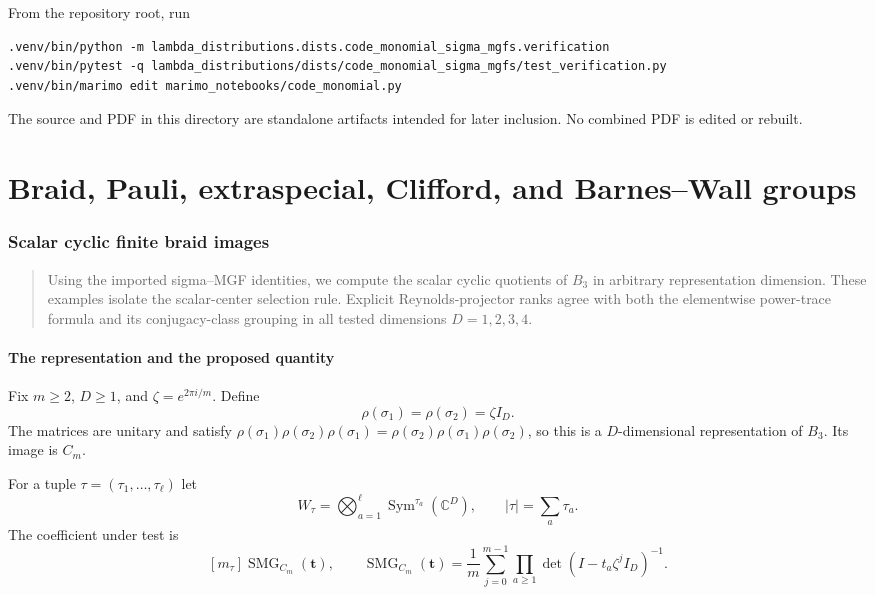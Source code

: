 \documentclass[10pt]{article}
\newcommand{\SMG}{\operatorname{SMG}}
\begin{document}
From the repository root, run
\begin{verbatim}
.venv/bin/python -m lambda_distributions.dists.code_monomial_sigma_mgfs.verification
.venv/bin/pytest -q lambda_distributions/dists/code_monomial_sigma_mgfs/test_verification.py
.venv/bin/marimo edit marimo_notebooks/code_monomial.py
\end{verbatim}
The source and PDF in this directory are standalone artifacts intended for
later inclusion.  No combined PDF is edited or rebuilt.

\clearpage
\part{Braid, Pauli, extraspecial, Clifford, and Barnes--Wall groups}
\section{Scalar cyclic finite braid images}\label{proof:braid-cyclic}
\begingroup
{}
\providecommand{\Sgm}{\SMG}
\renewcommand{\Sgm}{\SMG}
\setcounter{theorem}{0}
\setcounter{proposition}{0}
\setcounter{lemma}{0}
\setcounter{corollary}{0}
\setcounter{remark}{0}
\begin{abstract}
Using the imported sigma--MGF identities, we compute the scalar cyclic
quotients of $B_3$ in arbitrary representation dimension.  These examples
isolate the scalar-center selection rule.  Explicit Reynolds-projector ranks
agree with both the elementwise power-trace formula and its conjugacy-class
grouping in all tested dimensions $D=1,2,3,4$.
\end{abstract}

\subsection{The representation and the proposed quantity}
Fix $m\geq2$, $D\geq1$, and $\zeta=e^{2\pi i/m}$.  Define
\[
 \rho(\sigma_1)=\rho(\sigma_2)=\zeta I_D.
\]
The matrices are unitary and satisfy
$\rho(\sigma_1)\rho(\sigma_2)\rho(\sigma_1)
=\rho(\sigma_2)\rho(\sigma_1)\rho(\sigma_2)$, so this is a
$D$-dimensional representation of $B_3$.  Its image is $C_m$.

For a tuple $\tau=(\tau_1,\ldots,\tau_\ell)$ let
\[
 W_\tau=\bigotimes_{a=1}^{\ell}\operatorname{Sym}^{\tau_a}(\mathbb C^D),
 \qquad |\tau|=\sum_a\tau_a.
\]
The coefficient under test is
\[
 [m_\tau]\Sgm_{C_m}(\mathbf t),\qquad
 \Sgm_{C_m}(\mathbf t)=\frac1m\sum_{j=0}^{m-1}
 \prod_{a\geq1}\det(I-t_a\zeta^jI_D)^{-1}.
\]
\end{document}

